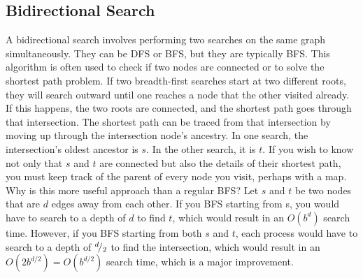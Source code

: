\subsection{Bidirectional Search}

A bidirectional search involves performing two searches on the same graph simultaneously. They can be DFS or BFS, but they are typically BFS. This algorithm is often used to check if two nodes are connected or to solve the shortest path problem. If two breadth-first searches start at two different roots, they will search outward until one reaches a node that the other visited already. If this happens, the two roots are connected, and the shortest path goes through that intersection. The shortest path can be traced from that intersection by moving up through the intersection node's ancestry. In one search, the intersection's oldest ancestor is $s$. In the other search, it is $t$. If you wish to know not only that $s$ and $t$ are connected but also the details of their shortest path, you must keep track of the parent of every node you visit, perhaps with a map. \\

Why is this more useful approach than a regular BFS? Let $s$ and $t$ be two nodes that are $d$ edges away from each other. If you BFS starting from s, you would have to search to a depth of $d$ to find $t$, which would result in an $O(b^d)$ search time. However, if you BFS starting from both $s$ and $t$, each process would have to search to a depth of ${}^{d}\!/_{2}$ to find the intersection, which would result in an $O(2b^{d/2})=O(b^{d/2})$ search time, which is a major improvement. \\

